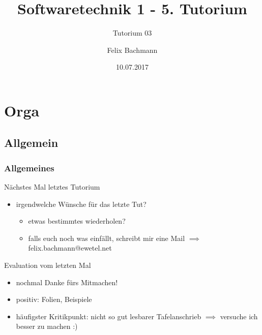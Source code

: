 \documentclass[18pt]{beamer}
\title[SWT1]{Softwaretechnik 1 - 5. Tutorium}
\subtitle{Tutorium 03}
\author{Felix Bachmann}
\date{10.07.2017}
\institute{KIT - Institut für Programmstrukturen und Datenorganisation (IPD)}
\begin{document}
	
	
\begin{frame}
\titlepage
\end{frame}

\begin{frame}
\tableofcontents
\end{frame}


\section{Orga}

	\subsection{Allgemein}
	\begin{frame}
		\frametitle{Allgemeines}
		\begin{alertblock}{Nächstes Mal letztes Tutorium} 
		\begin{itemize}
			\item irgendwelche Wünsche für das letzte Tut?
			\begin{itemize}
				\item etwas bestimmtes wiederholen?
				\item falls euch noch was einfällt, schreibt mir eine Mail
				\linebreak $\implies$ felix.bachmann@ewetel.net
			\end{itemize}
		\end{itemize}
		\end{alertblock}
		\pause
		\begin{block}{Evaluation vom letzten Mal}
			\begin{itemize}
				\item nochmal Danke fürs Mitmachen! \pause
				\item positiv: Folien, Beispiele \pause
				\item häufigster Kritikpunkt: nicht so gut lesbarer Tafelanschrieb
				\linebreak $\implies$ versuche ich besser zu machen :)
			\end{itemize}
		\end{block}
	\end{frame}
\end{document}
